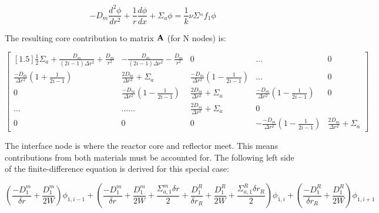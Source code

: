 \documentclass[../main.tex]{subfiles}
\begin{document}
\begin{equation*}
		-D_m \frac{d^2 \phi}{d r^2} + \frac{1}{r} \frac{d \phi}{dx} + \Sigma_a \phi =   \frac{1}{k} \nu \Sigma^_mf_1 \phi
	\end{equation*}
	


The resulting core contribution to matrix $\mathbf{A}$ (for N nodes) is:

\[
	\begin{bmatrix}[1.5]
		\frac{1}{2} \Sigma_a + \frac{D_m}{(2i-1)\Delta r^2} +\frac{D_m}{r^2} & -\frac{D_m}{(2i-1)\Delta r^2} - \frac{D_m}{r^2} & 0 & \dots & 0 \\
		\frac{-D_m}{\Delta r^2} \left( 1 + \frac{1}{2i-1} \right) & \frac{2D_m}{\Delta r^2} + \Sigma_a &  \frac{-D_m}{\Delta r^2} \left( 1 - \frac{1}{2i-1} \right) & \dots & 0 \\
		0 &  \frac{-D_m}{\Delta r^2} \left( 1 - \frac{1}{2i-1} \right) & \frac{2D_m}{\Delta r^2} + \Sigma_a & \frac{-D_m}{\Delta r^2} \left( 1 - \frac{1}{2i-1} \right) & 0\\
		\dots & \dots \dots & \frac{2D_m}{\Delta r^2} + \Sigma_a & 0 \\
		0 & 0 & 0 & -\frac{-D_m}{\Delta r^2} \left( 1 - \frac{1}{2i-1} \right) & \frac{2D_m}{\Delta r^2} + \Sigma_a
	\end{bmatrix}
	\]
	
The interface node is where the reactor core and reflector meet.  This means contributions from both materials must be accounted for.  The following left side of the finite-difference equation is derived for this special case:

	\begin{equation}
	\left( \frac{-D^m_1}{\delta r} + \frac{D^m_1}{2W} \right) \phi_{1,i-1} + \left( \frac{-D^m_1}{\delta r} + \frac{D^m_1}{2W} + \frac{\Sigma^m_{a,1} \delta r}{2} + \frac{D^R_1}{\delta r_R} + \frac{D^R_1}{2W} + \frac{\Sigma^R_{a,1} \delta r_R}{2} \right) \phi_{1,i} + \left( \frac{-D^R_1}{\delta r_R} + \frac{D^R_1}{2W} \right) \phi_{1,i+1}
	\end{equation}
\end{document}
